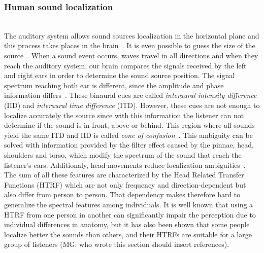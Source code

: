\documentclass[journal]{IEEEtran}
\begin{document}
\subsubsection*{Human sound localization}~\\
The auditory system allows sound sources localization in the horizontal plane and this process takes places in the brain~\cite{everest2009master}. It is even possible to guess the size of the source~\cite{}. When a sound event occurs, waves travel in all directions and when  they  reach the auditory system,  our  brain  compares  the signals  received  by  the  left  and  right  ears  in order to determine the sound source position.  The signal spectrum reaching both ear is different, since the amplitude and phase information differs~\cite{everest2009master}. These binaural cues are  called  \emph{interaural  intensity  difference}  (IID)  and  \emph{interaural time  difference}  (ITD). However, these cues are not enough to localize accurately the source since with this information the listener can not determine if the sound is in front, above or behind. This region where all sounds yield the same ITD and IID is called \textit{cone of confusion}~\cite{blauert1997spatial}.
This ambiguity can be solved with information provided by the filter effect caused by the pinnae, head, shoulders and torso, which modify the spectrum of the sound that reach the listener's ears. Additionaly, head movements reduce localization ambiguities~\cite{gelfand2004hearing}.  The sum of all these features are characterized by the Head Related Transfer Functions (HTRF) which are not only frequency and direction-dependent but also differ from person to person. That dependency makes therefore hard to generalize the spectral features among individuals. It is well known that using a HTRF from one person in another can significantly impair the  perception due to individual differences in anatomy, but it has also been shown that some people localize better the sounds than others, and their HTRFs are suitable for a large group of listeners (MG: who wrote this section should insert references).\\

\end{document}
